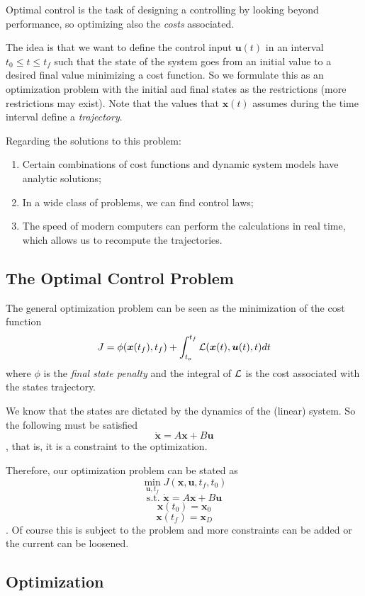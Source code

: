 Optimal control is the task of designing a controlling by looking beyond performance, so optimizing also the \emph{costs} associated.

The idea is that we want to define the control input  $\bm{u}(t)$ in an interval $t_0 \le t\le t_f$ such that the state of the system goes from an initial value to a desired final value minimizing a cost function. So we formulate this as an optimization problem with the initial and final states as the restrictions (more restrictions may exist). Note that the values that $\bm{x}(t)$ assumes during the time interval define a \emph{trajectory}.

Regarding the solutions to this problem:

\begin{enumerate}
    \item Certain combinations of cost functions and dynamic system models have analytic solutions;
    \item In a wide class of problems, we can find control laws;
    \item The speed of modern computers can perform the calculations in real time, which allows us to recompute the trajectories.
\end{enumerate}

\subsection*{The Optimal Control Problem}

The general optimization problem can be seen as the minimization of the cost function \[
J=\phi(\bm{x}(t_f),t_f) + \int_{t_o}^{t_f} \mathcal{L}(\bm{x}(t),\bm{u}(t),t)dt 
\] where $\phi$ is the \emph{final state penalty} and the integral of $\mathcal{L}$ is the cost associated with the states  trajectory.

We know that the states are dictated by the dynamics of the (linear) system. So the following must be satisfied \[
    \dot{\bm{x}} = A\bm{x} + B\bm{u}
\], that is, it is a constraint to the optimization.

Therefore, our optimization problem can be stated as \[
    \min_{\bm{u}, t_f} J(\bm{x},\bm{u},t_f,t_0)
\] \[
\textrm{s.t. } \dot{\bm{x}} = A\bm{x} + B\bm{u}
\] \[
\bm{x}(t_0) = \bm{x}_0
\] \[
\bm{x}(t_f) = \bm{x}_D
\]. Of course this is subject to the problem and more constraints can be added or the current can be loosened.

\subsection*{Optimization}

